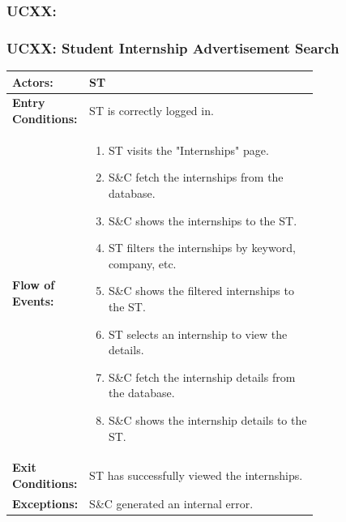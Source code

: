 \subsubsection{UCXX: }
\label{subsubsec:UC_02_TO_MODIFY}


\subsubsection{UCXX: Student Internship Advertisement Search}
\label{subsubsec:student-internship-advertisement-search}

\begin{center}
    \begin{longtable}{|l|p{0.75\linewidth}|}
        \hline
        \textbf{Actors:}           & ST                                                        \\
        \hline
        \textbf{Entry Conditions:} & ST is correctly logged in.                                \\
        \hline
        \textbf{Flow of Events:}   & \begin{enumerate}
                                         \item ST visits the "Internships" page.
                                         \item S\&C fetch the internships from the database.
                                         \item S\&C shows the internships to the ST.
                                         \item ST filters the internships by keyword, company, etc.
                                         \item S\&C shows the filtered internships to the ST.
                                         \item ST selects an internship to view the details.
                                         \item S\&C fetch the internship details from the database.
                                         \item S\&C shows the internship details to the ST.
                                     \end{enumerate} \\
        \hline
        \textbf{Exit Conditions:}  & ST has successfully viewed the internships.               \\
        \hline
        \textbf{Exceptions:}       & S\&C generated an internal error.                         \\
        \hline
    \end{longtable}
\end{center}

